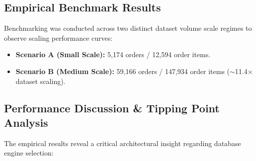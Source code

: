 \documentclass[peerreviewca]{IEEEtran}
\begin{document}
\subsection{Empirical Benchmark Results}
Benchmarking was conducted across two distinct dataset volume scale regimes to observe scaling performance curves:
\begin{itemize}
    \item \textbf{Scenario A (Small Scale):} 5,174 orders / 12,594 order items.
    \item \textbf{Scenario B (Medium Scale):} 59,166 orders / 147,934 order items ($\sim$11.4$\times$ dataset scaling).
\end{itemize}

\begin{table}[htbp]
\caption{Empirical Execution Time Benchmark Comparison (in milliseconds)}
\label{tab:benchmark_results}
\centering
{}
\end{table}

\subsection{Performance Discussion \& Tipping Point Analysis}
The empirical results reveal a critical architectural insight regarding database engine selection:
\end{document}
